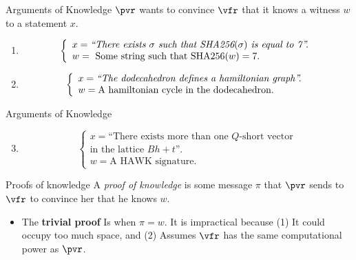 


\frame{\titlepage}

\begin{frame}{Arguments of Knowledge}
$\pvr$ wants to convince $\vfr$ that it knows a witness $w$ to a statement
$x$.
\begin{example}
	\begin{enumerate}
		\item
		\[
			\left\{
			\begin{array}{l}
				x= \mbox{\emph{``There exists
				$\sigma$ such that
				SHA256$(\sigma)$
				is equal to 7''.}}\\
				w=\  \mbox{Some string such that
				SHA256$(w) = 7$.} 
			\end{array}
			\right.
		\]
		\item
		\[
			\left\{
				\begin{array}{l}
					x= \mbox{\emph{``The dodecahedron
					defines a hamiltonian graph''.}}\\
					w= \mbox{A hamiltonian cycle in
					the dodecahedron.}
				\end{array}
			\right.
		\]
	\end{enumerate}
\end{example}
\end{frame}

\begin{frame}{Arguments of Knowledge}
\begin{example}
	\begin{enumerate}
		\setcounter{enumi}{2}
		\item
		\[
			\left\{
				\begin{array}{l}
					x= \mbox{``There exists more than
					one $Q$-short vector}\\
					\mbox{in the lattice
					$Bh+t$''.}\\
					w= \mbox{A HAWK signature.}
				\end{array}
			\right.
		\]
	\end{enumerate}
\end{example}

\begin{block}{Proofs of knowledge}
	A \emph{proof of knowledge} is some message $\pi$ that $\pvr$ sends
	to $\vfr$ to convince her that he knows $w$. 
	\begin{itemize}
		\item The \textbf{trivial proof} Is when $\pi= w$. It is
			impractical because (1) It could occupy too much
			space, and (2) Assumes $\vfr$ has the same
			computational power as $\pvr$.
	\end{itemize}
\end{block}
\end{frame}

